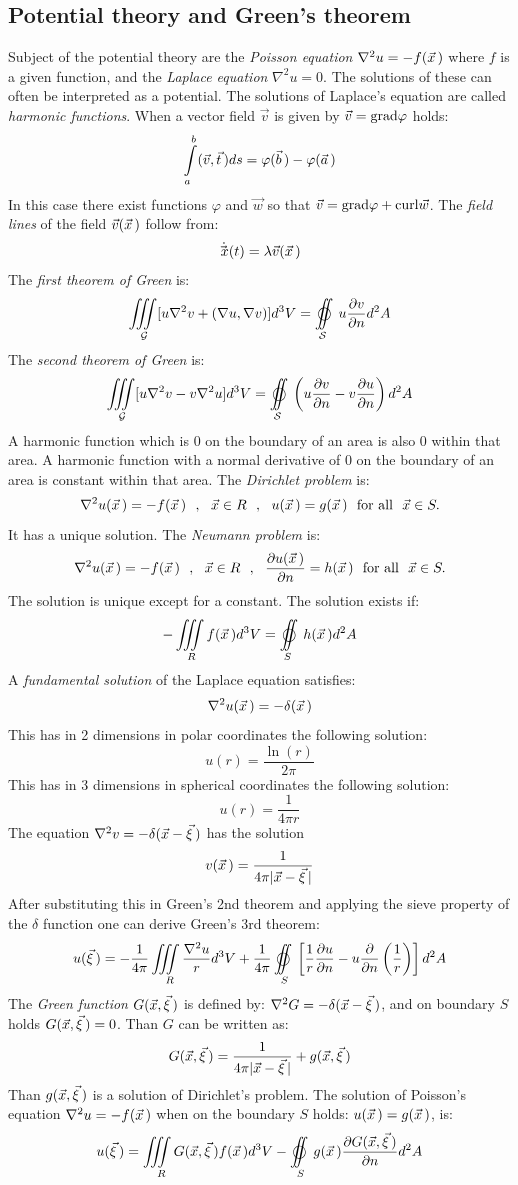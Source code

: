 \documentclass[twoside]{report}
\begin{document}
\subsection{Potential theory and Green's theorem}
Subject of the potential theory are the {\it Poisson equation}
$\nabla^2u=-f(\vec{x}\,)$ where $f$ is a given function, and the {\it Laplace
equation} $\nabla^2u=0$. The solutions of these can often be interpreted as
a potential. The solutions of Laplace's equation are called {\it harmonic
functions}.
\npar
When a vector field $\vec{v}$ is given by $\vec{v}={\rm grad}\varphi$
holds:
\[
\int\limits_a^b(\vec{v},\vec{t}\,)ds=\varphi(\vec{b}\,)-\varphi(\vec{a}\,)
\]
In this case there exist functions $\varphi$ and $\vec{w}$ so that
$\vec{v}={\rm grad}\varphi+{\rm curl}\vec{w}$.
\npar
The {\it field lines} of the field $\vec{v}(\vec{x}\,)$ follow from:
\[
\dot{\vec{x}\,}(t)=\lambda\vec{v}(\vec{x}\,)
\]
The {\it first theorem of Green} is:
\[
\iiint\limits_{\cal\!\!\! G}[u\nabla^2v+(\nabla u,\nabla v)]d^3V=\mathop{\oiint}\limits_{\cal\!\!\! S}u\Q{v}{n}d^2A
\]
The {\it second theorem of Green} is:
\[
\iiint\limits_{\cal\!\!\! G}[u\nabla^2v-v\nabla^2u]d^3V=\mathop{\oiint}\limits_{\cal\!\!\! S}\left(u\Q{v}{n}-v\Q{u}{n}\right)d^2A
\]
A harmonic function which is 0 on the boundary of an area is also 0 within that
area. A harmonic function with a normal derivative of 0 on the boundary of an
area is constant within that area.
\npar
The {\it Dirichlet problem} is:
\[
\nabla^2u(\vec{x}\,)=-f(\vec{x}\,)~~,~~\vec{x}\in R~~,~~u(\vec{x}\,)=g(\vec{x}\,)~~\mbox{for all}~~\vec{x}\in S.
\]
It has a unique solution.
\npar
The {\it Neumann problem} is:
\[
\nabla^2u(\vec{x}\,)=-f(\vec{x}\,)~~,~~\vec{x}\in R~~,~~\frac{\partial u(\vec{x}\,)}{\partial n}=h(\vec{x}\,)~~\mbox{for all}~~\vec{x}\in S.
\]
The solution is unique except for a constant. The solution exists if:
\[
-\iiint\limits_{\!\!\!R}f(\vvec{x})d^3V=\mathop{\oiint}_{\!\!\!S}h(\vvec{x})d^2A
\]
A {\it fundamental solution} of the Laplace equation satisfies:
\[
\nabla^2u(\vec{x}\,)=-\delta(\vec{x}\,)
\]
This has in 2 dimensions in polar coordinates the following solution:
\[
u(r)=\frac{\ln(r)}{2\pi}
\]
This has in 3 dimensions in spherical coordinates the following solution:
\[
u(r)=\frac{1}{4\pi r}
\]
The equation $\nabla^2v=-\delta(\vec{x}-\vec{\xi}\,)$ has the solution
\[
v(\vec{x}\,)=\frac{1}{4\pi|\vec{x}-\vec{\xi}\,|}
\]
After substituting this in Green's 2nd theorem and applying the sieve
property of the $\delta$ function one can derive Green's 3rd theorem:
\[
u(\vvec{\xi})=-\frac{1}{4\pi}\iiint\limits_R\frac{\nabla^2u}{r}d^3V+
\frac{1}{4\pi}\mathop{\oiint}\limits_S\left[\frac{1}{r}\Q{u}{n}-u\Q{}{n}\left(\frac{1}{r}\right)\right]d^2A
\]
The {\it Green function} $G(\vec{x},\vec{\xi}\,)$ is defined by:
$\nabla^2G=-\delta(\vec{x}-\vec{\xi}\,)$, and on boundary $S$ holds
$G(\vec{x},\vec{\xi}\,)=0$. Than $G$ can be written as:
\[
G(\vec{x},\vec{\xi}\,)=\frac{1}{4\pi|\vec{x}-\vec{\xi}\,|}+g(\vec{x},\vec{\xi}\,)
\]
Than $g(\vec{x},\vec{\xi}\,)$ is a solution of Dirichlet's problem. The solution
of Poisson's equation $\nabla^2u=-f(\vec{x}\,)$ when on the boundary $S$ holds:
$u(\vec{x}\,)=g(\vec{x}\,)$, is:
\[
u(\vvec{\xi})=\iiint\limits_RG(\vec{x},\vvec{\xi})f(\vvec{x})d^3V-
\mathop{\oiint}\limits_Sg(\vvec{x})\Q{G(\vec{x},\vvec{\xi})}{n}d^2A
\]
\end{document}
